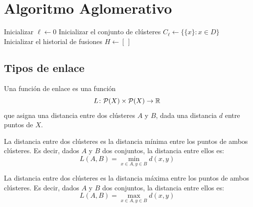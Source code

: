 \documentclass[a4,11pt]{aleph-notas}
\begin{document}
\encabezado

\section{Algoritmo Aglomerativo}

\begin{algorithm}[H]
   
    \caption{Pseudocódigo del agrupamiento jerárquico aglomerativo (AHC)}
    
    
    Inicializar $\ell \leftarrow 0$\;
    Inicializar el conjunto de clústeres $C_\ell \leftarrow \{\{x\}:x\in D\}$\;
    Inicializar el historial de fusiones $H \leftarrow [\,]$\;
    
    
\end{algorithm}

\subsection{Tipos de enlace}

\begin{defi}
    Una función de enlace es una función
    \[
        L\colon \mathcal{P}(X) \times \mathcal{P}(X) \rightarrow \mathbb{R}
    \]
    que asigna una distancia entre dos clústeres $A$ y $B$, dada una distancia $d$ entre puntos de $X$.
\end{defi}

\begin{defi}
    La distancia entre dos clústeres es la distancia mínima entre los puntos de ambos clústeres. Es decir, dados $A$ y $B$ dos conjuntos, la distancia entre ellos es:
    \[
        L(A,B) = \min_{x \in A, y \in B} d(x,y)
    \]
\end{defi}

\begin{defi}
    La distancia entre dos clústeres es la distancia máxima entre los puntos de ambos clústeres. Es decir, dados $A$ y $B$ dos conjuntos, la distancia entre ellos es:
    \[
        L(A,B) = \max_{x \in A, y \in B} d(x,y)
    \]
\end{defi}
\end{document}
